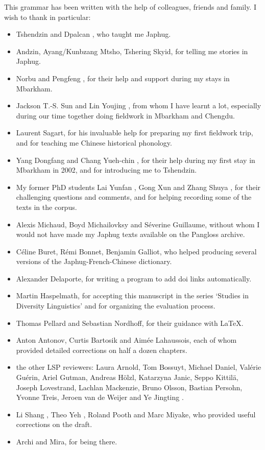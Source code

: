 %
%

This grammar has been written with the help of colleagues, friends and family. I wish to thank in particular:

\begin{itemize}
	\item Tshendzin  and  Dpalcan , who taught me Japhug.
	\item Andzin, Ayang/Kunbzang Mtsho,   Tshering Skyid, for telling me stories in Japhug.
	\item Norbu  and Pengfeng , for their help and support during my stays in Mbarkham.
	\item Jackson T.-S. Sun  and Lin Youjing , from whom I have learnt a lot, especially during our time together doing fieldwork in Mbarkham and Chengdu.	
	\item Laurent Sagart, for his invaluable help for preparing my first fieldwork trip, and for teaching me Chinese historical phonology.
	\item 	Yang Dongfang  and Chang Yueh-chin , for their help during my first stay in Mbarkham in 2002, and for introducing me to Tshendzin.
	\item My former PhD students Lai Yunfan , Gong Xun  and Zhang Shuya , for their challenging questions and comments, and for helping recording some of the texts in the corpus.
	\item Alexis Michaud, Boyd Michailovksy and Séverine Guillaume, without whom I would not have made my Japhug texts available on the Pangloss archive.
	\item Céline Buret, Rémi Bonnet, Benjamin Galliot, who helped producing several versions of the Japhug-French-Chinese dictionary.
	\item Alexander Delaporte, for writing a program to add doi links automatically.
	\item Martin Haspelmath, for accepting this manuscript in the series `Studies in Diversity Linguistics' and for organizing the evaluation process.
	\item Thomas Pellard and Sebastian Nordhoff, for their guidance with \LaTeX.
	\item Anton Antonov, Curtis Bartosik and Aimée Lahaussois, each of whom provided detailed corrections on half a dozen chapters.
	\item the other LSP reviewers: Laura Arnold, Tom Bossuyt, Michael Daniel, Valérie Guérin, Ariel Gutman, Andreas Hölzl, Katarzyna Janic, Seppo Kittilä, Joseph Lovestrand, Lachlan Mackenzie, Bruno Olsson, Bastian Persohn, Yvonne Treis, Jeroen van de Weijer and Ye Jingting .
	\item Li Shang , Theo Yeh , Roland Pooth and Marc Miyake, who provided useful corrections on the draft.
	\item Archi and Mira, for being there.
\end{itemize}
